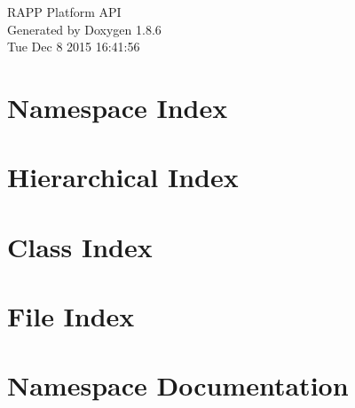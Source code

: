\documentclass[twoside]{book}
\newcommand{\clearemptydoublepage}{%
  \newpage{\pagestyle{empty}\cleardoublepage}%
}
\begin{document}
\hypersetup{pageanchor=false}
\begin{titlepage}
\vspace*{7cm}
\begin{center}%
{\Large R\-A\-P\-P Platform A\-P\-I }\\
\vspace*{1cm}
{\large Generated by Doxygen 1.8.6}\\
\vspace*{0.5cm}
{\small Tue Dec 8 2015 16:41:56}\\
\end{center}
\end{titlepage}
\clearemptydoublepage
\tableofcontents
\clearemptydoublepage
{}
\hypersetup{pageanchor=true}

\chapter{Namespace Index}

\chapter{Hierarchical Index}

\chapter{Class Index}

\chapter{File Index}

\chapter{Namespace Documentation}












\end{document}
